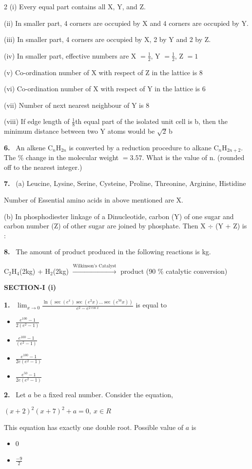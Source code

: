 \documentclass[10pt]{extarticle}
\newcommand{\partsec}[2]{\par\medskip\noindent{\large\bfseries PART-#1: #2}\par\smallskip}
\newcommand{\sect}[1]{\par\smallskip\noindent\textbf{#1}\par}
\newcommand{\qn}[1]{\par\smallskip\noindent\textbf{#1.}~}
\newenvironment{qoptions}{\begin{itemize}[leftmargin=1.8em,itemsep=1pt,topsep=2pt,label={}]}{\end{itemize}}
\newcommand{\opt}[2]{\item[(#1)] #2}
\begin{document}
\begin{multicols}{2}
(i) Every equal part contains all X, Y, and Z.\par
(ii) In smaller part, 4 corners are occupied by X and 4 corners are occupied by Y.\par
(iii) In smaller part, 4 corners are occupied by X, 2 by Y and 2 by Z.\par
(iv) In smaller part, effective numbers are X $=\frac12$, Y $=\frac12$, Z $=1$\par
(v) Co-ordination number of X with respect of Z in the lattice is 8\par
(vi) Co-ordination number of X with respect of Y in the lattice is 6\par
(vii) Number of next nearest neighbour of Y is 8\par
(viii) If edge length of $\frac18$th equal part of the isolated unit cell is b, then the minimum distance between two Y atoms would be $\sqrt2\,$b
\qn{6} An alkene C$_n$H$_{2n}$ is converted by a reduction procedure to alkane C$_n$H$_{2n+2}$. The \% change in the molecular weight $=3.57$. What is the value of n. (rounded off to the nearest integer.)
\qn{7} (a) Leucine, Lysine, Serine, Cysteine, Proline, Threonine, Arginine, Histidine\par
Number of Essential amino acids in above mentioned are X.\par
(b) In phosphodiester linkage of a Dinucleotide, carbon (Y) of one sugar and carbon number (Z) of other sugar are joined by phosphate. Then X $\div$ (Y + Z) is :
\qn{8} The amount of product produced in the following reactions is \underline{\hspace{1.5cm}}kg.\par
C$_2$H$_4$(2kg) + H$_2$(2kg) $\xrightarrow{\text{Wilkinson's Catalyst}}$ product (90 \% catalytic conversion)
\raggedcolumns
\partsec{3}{MATHEMATICS}
\sect{SECTION-I (i)}
\qn{1} $\displaystyle\lim_{x\to0}\frac{\ln\left(\sec(e^x)\sec(e^2x)\ldots\sec(e^{50}x)\right)}{e^2-e^{2\cos x}}$ is equal to
\begin{qoptions}
\opt{A}{$\frac{e^{100}-1}{2(e^2-1)}$}
\opt{B}{$\frac{e^{100}-1}{(e^2-1)}$}
\opt{C}{$\frac{e^{100}-1}{2e(e^2-1)}$}
\opt{D}{$\frac{e^{50}-1}{2e(e^2-1)}$}
\end{qoptions}
\qn{2} Let $a$ be a fixed real number. Consider the equation,\par
$(x+2)^2(x+7)^2+a=0,\ x\in R$\par
This equation has exactly one double root. Possible value of $a$ is
\begin{qoptions}
\opt{A}{0}
\opt{B}{$\frac{-9}{2}$}

\end{qoptions}
\end{multicols}
\end{document}

